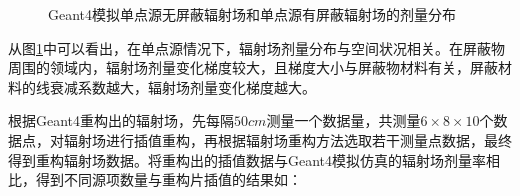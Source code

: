 \begin{figure}[htbp]
    \caption{Geant4模拟单点源无屏蔽辐射场和单点源有屏蔽辐射场的剂量分布}
    \label{Geant4模拟无屏蔽辐射场和有屏蔽辐射场的剂量分布}
\end{figure}

从图\ref{Geant4模拟无屏蔽辐射场和有屏蔽辐射场的剂量分布}中可以看出，在单点源情况下，辐射场剂量分布与空间状况相关。在屏蔽物周围的领域内，辐射场剂量变化梯度较大，且梯度大小与屏蔽物材料有关，屏蔽材料的线衰减系数越大，辐射场剂量变化梯度越大。

根据Geant4重构出的辐射场，先每隔$ 50cm $测量一个数据量，共测量$ 6 \times 8 \times 10 $个数据点，对辐射场进行插值重构，再根据辐射场重构方法选取若干测量点数据，最终得到重构辐射场数据。将重构出的插值数据与Geant4模拟仿真的辐射场剂量率相比，得到不同源项数量与重构片插值的结果如：

